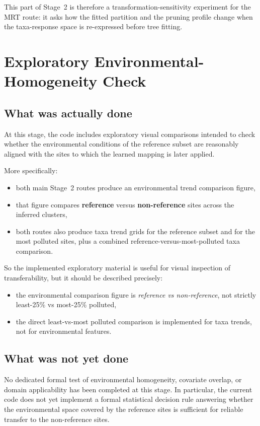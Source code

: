 \documentclass[11pt]{article}
\begin{document}
This part of Stage~2 is therefore a transformation-sensitivity experiment for the MRT route: it asks how the fitted partition and the pruning profile change when the taxa-response space is re-expressed before tree fitting.

\section{Exploratory Environmental-Homogeneity Check}

\subsection{What was actually done}

At this stage, the code includes exploratory visual comparisons intended to check whether the environmental conditions of the reference subset are reasonably aligned with the sites to which the learned mapping is later applied.

More specifically:
\begin{itemize}[leftmargin=*]
  \item both main Stage~2 routes produce an environmental trend comparison figure,
  \item that figure compares \textbf{reference} versus \textbf{non-reference} sites across the inferred clusters,
  \item both routes also produce taxa trend grids for the reference subset and for the most polluted sites, plus a combined reference-versus-most-polluted taxa comparison.
\end{itemize}

So the implemented exploratory material is useful for visual inspection of transferability, but it should be described precisely:
\begin{itemize}[leftmargin=*]
  \item the environmental comparison figure is \emph{reference vs non-reference}, not strictly least-25\% vs most-25\% polluted,
  \item the direct least-vs-most polluted comparison is implemented for taxa trends, not for environmental features.
\end{itemize}

\subsection{What was not yet done}

No dedicated formal test of environmental homogeneity, covariate overlap, or domain applicability has been completed at this stage. In particular, the current code does not yet implement a formal statistical decision rule answering whether the environmental space covered by the reference sites is sufficient for reliable transfer to the non-reference sites.
\end{document}
